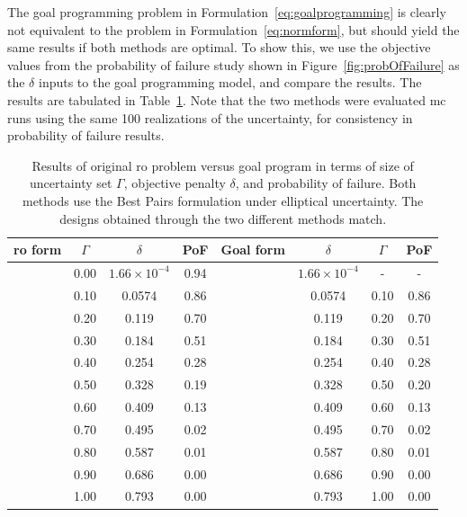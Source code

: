 The goal programming problem in Formulation~\ref{eq:goalprogramming} is clearly
not equivalent to the problem in Formulation~\ref{eq:normform},
but should yield the same results if both methods are optimal.
To show this, we use the objective values from the probability of failure study
shown in Figure~\ref{fig:probOfFailure} as the $\delta$ inputs to the goal programming model, and compare the results.
The results are tabulated in
Table~\ref{tab:deltaVsGamma}. Note that the two methods were evaluated \gls{mc} runs using the same 100 realizations
of the uncertainty, for consistency in probability of failure results.

\begin{table}
\begin{center}
\caption{\label{tab:deltaVsGamma} Results of original \gls{ro} problem versus goal program in terms
of size of uncertainty set $\Gamma$, objective penalty $\delta$, and probability of failure. Both methods
use the Best Pairs formulation under elliptical uncertainty. The designs obtained through
the two different methods match.}
\begin{tabular}{c c c c c c c c}
\hline
 \gls{ro} form & $\Gamma$ & $\delta$ & PoF & Goal form & $\delta$ & $\Gamma$ & PoF\\
\hline
[0.05743024, 0.11851723, 0.18380981, 0.25366356, 0.32846855,
       0.40865086, 0.49467057, 0.58711924, 0.68640341, 0.79334624]
& 0.00 & $1.66 \times 10^{-4}$ & 0.94 & & $1.66 \times 10^{-4}$ & - & - \\
& 0.10 & 0.0574 & 0.86 & & 0.0574 & 0.10 & 0.86 \\
& 0.20 & 0.119 & 0.70 & & 0.119 & 0.20 & 0.70 \\
& 0.30 & 0.184 & 0.51 & & 0.184 & 0.30 & 0.51 \\
& 0.40 & 0.254 & 0.28 & & 0.254 & 0.40 & 0.28 \\
& 0.50 & 0.328 & 0.19 & & 0.328 & 0.50 & 0.20 \\
& 0.60 & 0.409 & 0.13 & & 0.409 & 0.60 & 0.13 \\
& 0.70 & 0.495 & 0.02 & & 0.495 & 0.70 & 0.02 \\
& 0.80 & 0.587 & 0.01 & & 0.587 & 0.80 & 0.01 \\
& 0.90 & 0.686 & 0.00 & & 0.686 & 0.90 & 0.00 \\
& 1.00 & 0.793 & 0.00 & & 0.793 & 1.00 & 0.00 \\
\end{tabular}
\end{center}
\end{table}

